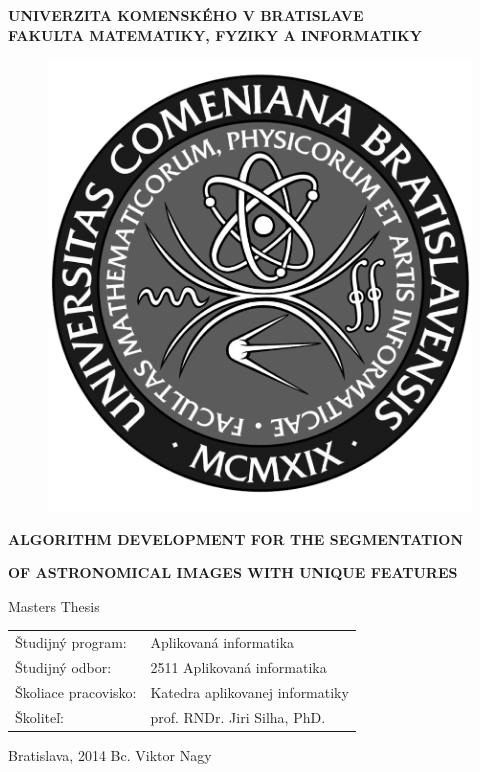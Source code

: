 \documentclass[12pt, a4paper, oneside]{book}
\newcommand\mfthesistype{Masters Thesis}
\newcommand\mfauthor{Bc. Viktor Nagy}
\newcommand\mfadvisor{prof. RNDr. Jiri Silha, PhD.}
\newcommand\mfplacedate{Bratislava, 2014}
\newcommand\mfuniversity{UNIVERZITA KOMENSKÉHO V BRATISLAVE}
\newcommand\mffaculty{FAKULTA MATEMATIKY, FYZIKY A INFORMATIKY}
\begin{document}
\thispagestyle{empty}

\noindent
\begin{minipage}{\textwidth}
\begin{center}
\textbf{\mfuniversity \\
\mffaculty}
\end{center}
\end{minipage}

\vfill
\begin{figure}[!hbt]
\begin{center}
\includegraphics{images/logo_fmph_dark}
\label{img:logo_dark}
\end{center}
\end{figure}
\begin{center}
\begin{minipage}{0.8\textwidth}
        \centerline{\textbf{\Large\MakeUppercase{Algorithm development for the segmentation}}}
        \centerline{\textbf{\Large\MakeUppercase{of astronomical images with unique features}}}
\smallskip
\centerline{\mfthesistype}
\end{minipage}
\end{center}
\vfill
\begin{tabular}{l l}
Študijný program: & Aplikovaná informatika\\
Študijný odbor: & 2511 Aplikovaná informatika\\
Školiace pracovisko: & Katedra aplikovanej informatiky\\
Školiteľ: & \mfadvisor
\end{tabular}
\vfill
\noindent
\mfplacedate \hfill
\mfauthor
\eject
\end{document}

